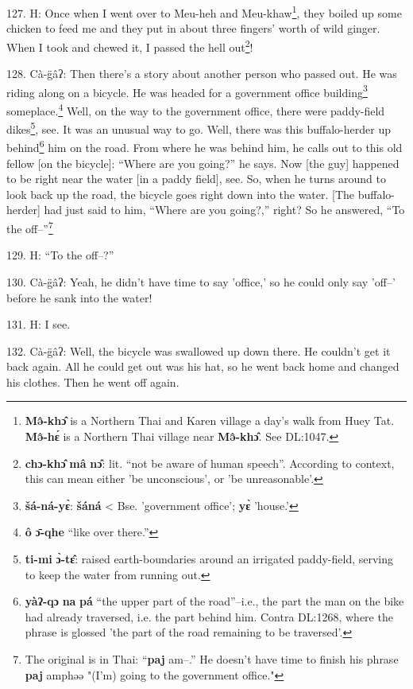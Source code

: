 127. H: Once when I went over to Meu-heh and Meu-khaw\footnote{\textbf{Mə̂-khɔ̂} is a Northern Thai and Karen village a day's walk from Huey Tat. \textbf{Mə̂-hɛ́} is a Northern Thai village near \textbf{Mə̂-khɔ̂}. See DL:1047.}, they boiled up some
chicken to feed me and they put in about three fingers' worth of wild ginger. When
I took and chewed it, I passed the hell out\footnote{\textbf{chɔ-khɔ̂} \textbf{mâ} \textbf{nɔ̂}: lit. ``not be aware of human speech''. According to context, this can mean either 'be unconscious', or 'be unreasonable'.}!

\begin{center}
\end{center}

128. Cà-g̈âʔ: Then there's a story about another person who passed out. He was
riding along on a bicycle. He was headed for a government office building\footnote{\textbf{šá-ná-yɛ̀}: \textbf{šáná} < Bse. 'government office'; \textbf{yɛ̀} 'house.'}
someplace.\footnote{\textbf{ô} \textbf{ɔ̄-qhe} ``like over there.''} Well, on the way to the government office, there were paddy-field
dikes\footnote{\textbf{ti-mi} \textbf{ɔ̀-tɛ̂}: raised earth-boundaries around an irrigated paddy-field, serving to keep the water from running out.}, see. It was an unusual way to go. Well, there was this buffalo-herder
up behind\footnote{\textbf{yàʔ-qɔ} \textbf{na} \textbf{pá} ``the upper part of the road''--i.e., the part the man on the bike had already traversed, i.e. the part behind him. Contra DL:1268, where the phrase is glossed 'the part of the road remaining to be traversed'.} him on the road. From where he was behind him, he calls out to this
old fellow [on the bicycle]: ``Where are you going?'' he says.
Now [the guy] happened to be right near the water [in a paddy field], see. So,
when he turns around to look back up the road, the bicycle goes right down into
the water. [The buffalo-herder] had just said to him, ``Where are you going?,''
right? So he answered, ``To the off--''\footnote{The original is in Thai: ``\textbf{paj} am--.'' He doesn't have time to finish his phrase \textbf{paj} amphəə "(I'm) going to the government office."}

129. H: ``To the off--?''

130. Cà-g̈âʔ: Yeah, he didn't have time to say 'office,' so he could only say
'off--' before he sank into the water!

131. H: I see.

132. Cà-g̈âʔ: Well, the bicycle was swallowed up down there. He couldn't get
it back again. All he could get out was his hat, so he went back home and changed
his clothes. Then he went off again.

